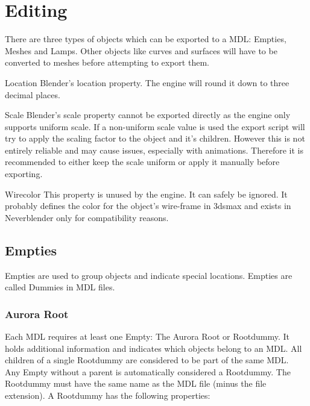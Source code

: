 \chapter{Editing}
There are three types of objects which can be exported to a MDL: Empties,
Meshes and Lamps. Other objects like curves and surfaces will have to be
converted to meshes before attempting to export them.

\begin{propertyBlender}{Location}
    Blender's location property. The engine will round it down to three decimal places.
\end{propertyBlender} 

\begin{propertyBlender}{Scale}
    Blender's scale property cannot be exported directly as the engine 
    only supports uniform scale. If a non-uniform scale value is used the export 
    script will try to apply the scaling factor to the object and it's children.
    However this is not entirely reliable and may cause issues, especially with 
    animations. Therefore it is recommended to either keep the scale uniform or 
    apply it manually before exporting.
\end{propertyBlender}  

\begin{propertyAurora}{Wirecolor}
    This property is unused by the engine. It can safely be ignored. It probably defines the
    color for the object's wire-frame in 3dsmax and exists in Neverblender only for 
    compatibility reasons.
\end{propertyAurora}


\section{Empties}
Empties are used to group objects and indicate special 
locations. Empties are called Dummies in MDL files.


\subsection{Aurora Root}
Each MDL requires at least one Empty: The Aurora Root or Rootdummy. It holds 
additional information and indicates which objects belong to an MDL. All children
of a single Rootdummy are considered to be part of the same MDL. \\

Any Empty without a parent is automatically considered a Rootdummy. 
The Rootdummy must have the same name as the MDL file (minus the file extension). 
A Rootdummy has the following properties:

